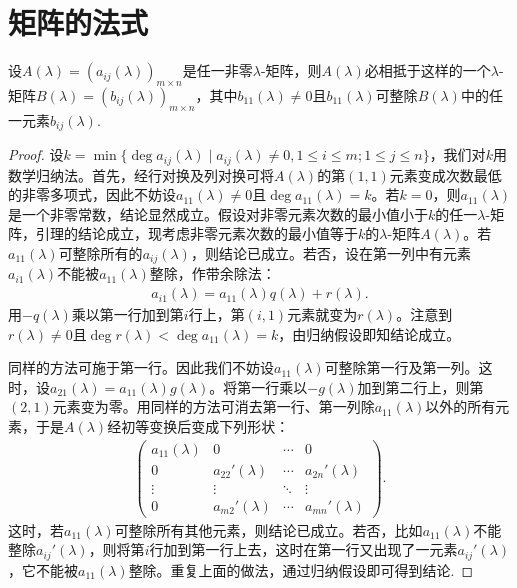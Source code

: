 \documentclass[../../main.tex]{subfiles}
\begin{document}
\section{矩阵的法式}

\begin{lemma}\label{lemma:lambda矩阵一定相抵于b_11整除所有元素的矩阵}
设$A(\lambda)=(a_{ij}(\lambda))_{m\times n}$是任一非零$\lambda$-矩阵，则$A(\lambda)$必相抵于这样的一个$\lambda$-矩阵$B(\lambda)=(b_{ij}(\lambda))_{m\times n}$，其中$b_{11}(\lambda)\neq 0$且$b_{11}(\lambda)$可整除$B(\lambda)$中的任一元素$b_{ij}(\lambda)$.
\end{lemma}
\begin{proof}
设$k = \min\{\deg a_{ij}(\lambda)\mid a_{ij}(\lambda)\neq 0, 1\leqslant  i\leqslant  m; 1\leqslant  j\leqslant  n\}$，我们对$k$用数学归纳法。首先，经行对换及列对换可将$A(\lambda)$的第$(1,1)$元素变成次数最低的非零多项式，因此不妨设$a_{11}(\lambda)\neq 0$且$\deg a_{11}(\lambda)=k$。若$k = 0$，则$a_{11}(\lambda)$是一个非零常数，结论显然成立。假设对非零元素次数的最小值小于$k$的任一$\lambda$-矩阵，引理的结论成立，现考虑非零元素次数的最小值等于$k$的$\lambda$-矩阵$A(\lambda)$。若$a_{11}(\lambda)$可整除所有的$a_{ij}(\lambda)$，则结论已成立。若否，设在第一列中有元素$a_{i1}(\lambda)$不能被$a_{11}(\lambda)$整除，作带余除法：
\begin{align*}
a_{i1}(\lambda)=a_{11}(\lambda)q(\lambda)+r(\lambda).
\end{align*}
用$-q(\lambda)$乘以第一行加到第$i$行上，第$(i,1)$元素就变为$r(\lambda)$。注意到$r(\lambda)\neq 0$且$\deg r(\lambda)<\deg a_{11}(\lambda)=k$，由归纳假设即知结论成立。

同样的方法可施于第一行。因此我们不妨设$a_{11}(\lambda)$可整除第一行及第一列。这时，设$a_{21}(\lambda)=a_{11}(\lambda)g(\lambda)$。将第一行乘以$-g(\lambda)$加到第二行上，则第$(2,1)$元素变为零。用同样的方法可消去第一行、第一列除$a_{11}(\lambda)$以外的所有元素，于是$A(\lambda)$经初等变换后变成下列形状：
\begin{align*}
\begin{pmatrix}
a_{11}(\lambda)&0&\cdots&0\\
0&a_{22}'(\lambda)&\cdots&a_{2n}'(\lambda)\\
\vdots&\vdots&\ddots&\vdots\\
0&a_{m2}'(\lambda)&\cdots&a_{mn}'(\lambda)
\end{pmatrix}.
\end{align*}
这时，若$a_{11}(\lambda)$可整除所有其他元素，则结论已成立。若否，比如$a_{11}(\lambda)$不能整除$a_{ij}'(\lambda)$，则将第$i$行加到第一行上去，这时在第一行又出现了一元素$a_{ij}'(\lambda)$，它不能被$a_{11}(\lambda)$整除。重复上面的做法，通过归纳假设即可得到结论.
\end{proof}
\end{document}
